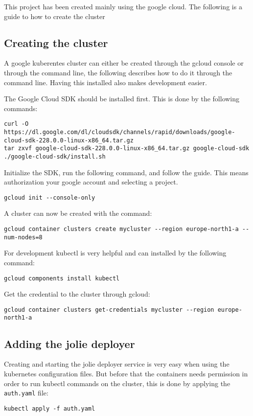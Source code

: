 \documentclass[Report.tex]{subfiles}
\begin{document}

This project has been created mainly using the google cloud. The following is a guide to how to create the cluster



\subsection{Creating the cluster}
A google kuberentes cluster can either be created through the gcloud console or through the command line, the following describes how to do it through the command line. Having this installed also makes development easier.

The Google Cloud SDK should be installed first. This is done by the following commands:
\begin{lstlisting}[style=terminal]
curl -O https://dl.google.com/dl/cloudsdk/channels/rapid/downloads/google-cloud-sdk-228.0.0-linux-x86_64.tar.gz
tar zxvf google-cloud-sdk-228.0.0-linux-x86_64.tar.gz google-cloud-sdk
./google-cloud-sdk/install.sh
\end{lstlisting}

Initialize the SDK, run the following command, and follow the guide. This means authorization your google account and selecting a project.
\begin{lstlisting}[style=terminal]
gcloud init --console-only
\end{lstlisting}

A cluster can now be created with the command:
\begin{lstlisting}[style=terminal]
gcloud container clusters create mycluster --region europe-north1-a --num-nodes=8
\end{lstlisting}

For development kubectl is very helpful and can installed by the following command:
\begin{lstlisting}[style=terminal]
gcloud components install kubectl
\end{lstlisting}

Get the credential to the cluster through gcloud:
\begin{lstlisting}[style=terminal]
gcloud container clusters get-credentials mycluster --region europe-north1-a
\end{lstlisting}


\subsection{Adding the jolie deployer}
Creating and starting the jolie deployer service is very easy when using the kubernetes configuration files. But before that the containers needs permission in order to run kubectl commands on the cluster, this is done by applying the \texttt{auth.yaml} file:
\begin{lstlisting}[style=terminal]
kubectl apply -f auth.yaml
\end{lstlisting}
\end{document}
